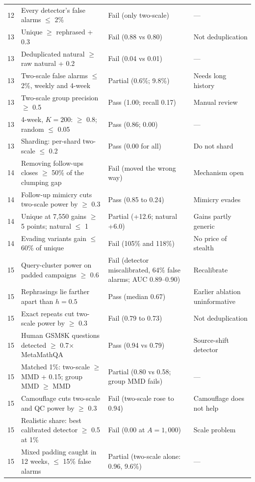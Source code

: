 \begin{longtable}{p{}p{}p{}p{}}
12 & Every detector's false alarms $\le$ 2\% & Fail (only two-scale) & --- \\
13 & Unique $\ge$ rephrased + 0.3 & Fail (0.88 vs 0.80) & Not deduplication \\
13 & Deduplicated natural $\ge$ raw natural + 0.2 & Fail (0.04 vs 0.01) & --- \\
13 & Two-scale false alarms $\le$ 2\%, weekly and 4-week & Partial (0.6\%; 9.8\%) & Needs long history \\
13 & Two-scale group precision $\ge$ 0.5 & Pass (1.00; recall 0.17) & Manual review \\
13 & 4-week, $K=200$: $\ge$ 0.8; random $\le$ 0.05 & Pass (0.86; 0.00) & --- \\
13 & Sharding: per-shard two-scale $\le$ 0.2 & Pass (0.00 for all) & Do not shard \\
14 & Removing follow-ups closes $\ge$ 50\% of the clumping gap & Fail (moved the wrong way) & Mechanism open \\
14 & Follow-up mimicry cuts two-scale power by $\ge$ 0.3 & Pass (0.85 to 0.24) & Mimicry evades \\
14 & Unique at 7{,}550 gains $\ge$ 5 points; natural $\le$ 1 & Partial (+12.6; natural +6.0) & Gains partly generic \\
14 & Evading variants gain $\le$ 60\% of unique & Fail (105\% and 118\%) & No price of stealth \\
15 & Query-cluster power on padded campaigns $\ge$ 0.6 & Fail (detector miscalibrated, 64\% false alarms; AUC 0.89--0.90) & Recalibrate \\
15 & Rephrasings lie farther apart than $h=0.5$ & Pass (median 0.67) & Earlier ablation uninformative \\
15 & Exact repeats cut two-scale power by $\ge$ 0.3 & Fail (0.79 to 0.73) & Not deduplication \\
15 & Human GSM8K questions detected $\ge$ 0.7$\times$ MetaMathQA & Pass (0.94 vs 0.79) & Source-shift detector \\
15 & Matched 1\%: two-scale $\ge$ MMD + 0.15; group MMD $\ge$ MMD & Partial (0.80 vs 0.58; group MMD fails) & --- \\
15 & Camouflage cuts two-scale and QC power by $\ge$ 0.3 & Fail (two-scale rose to 0.94) & Camouflage does not help \\
15 & Realistic share: best calibrated detector $\ge$ 0.5 at 1\% & Fail (0.00 at $A=1{,}000$) & Scale problem \\
15 & Mixed padding caught in 12 weeks, $\le$ 15\% false alarms & Partial (two-scale alone: 0.96, 9.6\%) & ---\\

\end{longtable}
